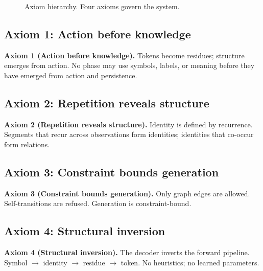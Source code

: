 \documentclass[10pt]{article}
\begin{document}
\begin{figure}[t]
\centering
{}
\caption{Axiom hierarchy. Four axioms govern the system.}
\label{fig:axioms}
\end{figure}

\subsection{Axiom 1: Action before knowledge}

\textbf{Axiom 1 (Action before knowledge).}
Tokens become residues; structure emerges from action. No phase may use symbols, labels, or meaning before they have emerged from action and persistence.

\subsection{Axiom 2: Repetition reveals structure}

\textbf{Axiom 2 (Repetition reveals structure).}
Identity is defined by recurrence. Segments that recur across observations form identities; identities that co-occur form relations.

\subsection{Axiom 3: Constraint bounds generation}

\textbf{Axiom 3 (Constraint bounds generation).}
Only graph edges are allowed. Self-transitions are refused. Generation is constraint-bound.

\subsection{Axiom 4: Structural inversion}

\textbf{Axiom 4 (Structural inversion).}
The decoder inverts the forward pipeline. Symbol $\rightarrow$ identity $\rightarrow$ residue $\rightarrow$ token. No heuristics; no learned parameters.
\end{document}
